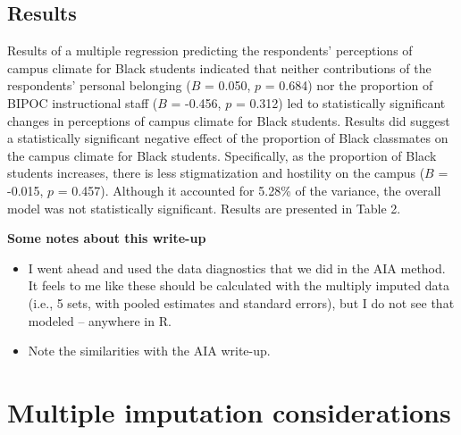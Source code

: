 \documentclass[
  english,
]{book}
\providecommand{\tightlist}{%
  \setlength{\itemsep}{0pt}\setlength{\parskip}{0pt}}
\begin{document}
\hypertarget{results-1}{%
\subsection{Results}\label{results-1}}

Results of a multiple regression predicting the respondents' perceptions of campus climate for Black students indicated that neither contributions of the respondents' personal belonging (\(B\) = 0.050, \(p\) = 0.684) nor the proportion of BIPOC instructional staff (\(B\) = -0.456, \(p\) = 0.312) led to statistically significant changes in perceptions of campus climate for Black students. Results did suggest a statistically significant negative effect of the proportion of Black classmates on the campus climate for Black students. Specifically, as the proportion of Black students increases, there is less stigmatization and hostility on the campus (\(B\) = -0.015, \(p\) = 0.457). Although it accounted for 5.28\% of the variance, the overall model was not statistically significant. Results are presented in Table 2.

\textbf{Some notes about this write-up}

\begin{itemize}
\tightlist
\item
  I went ahead and used the data diagnostics that we did in the AIA method. It feels to me like these should be calculated with the multiply imputed data (i.e., 5 sets, with pooled estimates and standard errors), but I do not see that modeled -- anywhere in R.
\item
  Note the similarities with the AIA write-up.
\end{itemize}

\hypertarget{multiple-imputation-considerations}{%
\section{Multiple imputation considerations}\label{multiple-imputation-considerations}}
\end{document}
